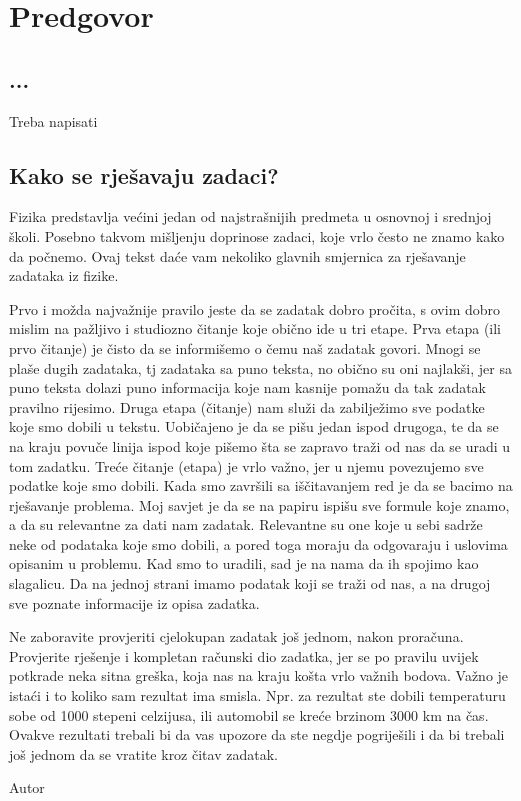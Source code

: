 \chapter*{Predgovor}


	\section*{ ... }
	Treba napisati
	\section*{Kako se rješavaju zadaci?}
	Fizika predstavlja većini jedan od najstrašnijih predmeta u osnovnoj i srednjoj školi. Posebno takvom mišljenju doprinose zadaci, koje vrlo često ne znamo kako da počnemo. Ovaj tekst daće vam nekoliko glavnih smjernica za rješavanje zadataka iz fizike.
	
	Prvo i možda najvažnije pravilo jeste da se zadatak dobro pročita, s ovim dobro mislim na pažljivo i studiozno čitanje koje obično ide u tri etape. Prva etapa (ili prvo čitanje) je čisto da se informišemo  o čemu naš zadatak govori. Mnogi se plaše dugih zadataka, tj zadataka sa puno teksta, no obično su oni najlakši, jer sa puno teksta dolazi puno informacija koje nam kasnije pomažu da tak zadatak pravilno rijesimo.
	Druga etapa (čitanje) nam služi da zabilježimo sve podatke koje smo dobili u tekstu. Uobičajeno je  da se pišu jedan ispod drugoga, te da se na kraju povuče linija ispod koje pišemo šta se zapravo traži od nas da se uradi u tom zadatku. Treće čitanje (etapa) je vrlo važno, jer u njemu povezujemo sve podatke koje smo dobili.
	Kada smo završili sa iščitavanjem red je da se bacimo na rješavanje problema. Moj savjet je da se na papiru ispišu sve formule koje znamo, a da su relevantne za dati nam zadatak. Relevantne su one koje u sebi sadrže neke od podataka koje smo dobili, a pored toga moraju da odgovaraju i uslovima opisanim u problemu. Kad smo to uradili, sad je na nama da ih spojimo kao slagalicu. Da na jednoj strani imamo podatak koji se traži od nas, a na drugoj sve poznate informacije iz opisa zadatka.
	
	Ne zaboravite provjeriti cjelokupan zadatak još jednom, nakon proračuna. Provjerite rješenje i kompletan računski dio zadatka, jer se po pravilu uvijek potkrade neka sitna greška, koja nas  na kraju košta vrlo važnih bodova.
	Važno je istaći i to koliko sam rezultat ima smisla. Npr.  za rezultat ste dobili temperaturu sobe od 1000 stepeni celzijusa, ili automobil se kreće brzinom 3000 km na čas. Ovakve rezultati trebali bi da vas upozore da ste negdje pogriješili i da bi trebali još jednom da se vratite  kroz čitav zadatak.
	
	\begin{flushright}
		Autor
	\end{flushright}
	\newpage
	\patchcmd{\chapter}
	{\clearpage}
	{\cleardoublepage}
	{}
	{}
		\pagestyle{headings}